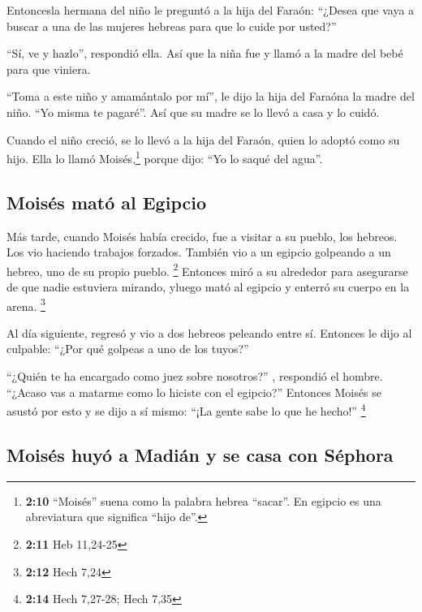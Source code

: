  Entoncesla hermana del niño le preguntó a la hija del
Faraón: ``¿Desea que vaya a buscar a una de las mujeres hebreas para que
lo cuide por usted?''

 ``Sí, ve y hazlo'', respondió ella. Así que la niña fue y
llamó a la madre del bebé para que viniera.

 ``Toma a este niño y amamántalo por mí'', le dijo la hija
del Faraóna la madre del niño. ``Yo misma te pagaré''. Así que su madre
se lo llevó a casa y lo cuidó.

 Cuando el niño creció, se lo llevó a la hija del Faraón,
quien lo adoptó como su hijo. Ella lo llamó Moisés,\footnote{\textbf{2:10}
  ``Moisés'' suena como la palabra hebrea ``sacar''. En egipcio es una
  abreviatura que significa ``hijo de''.} porque dijo: ``Yo lo saqué del
agua''.

\hypertarget{moisuxe9s-matuxf3-al-egipcio}{%
\subsection{Moisés mató al Egipcio}\label{moisuxe9s-matuxf3-al-egipcio}}

 Más tarde, cuando Moisés había crecido, fue a visitar a
su pueblo, los hebreos. Los vio haciendo trabajos forzados. También vio
a un egipcio golpeando a un hebreo, uno de su propio pueblo. \footnote{\textbf{2:11}
  Heb 11,24-25}  Entonces miró a su alrededor para
asegurarse de que nadie estuviera mirando, yluego mató al egipcio y
enterró su cuerpo en la arena. \footnote{\textbf{2:12} Hech 7,24}

 Al día siguiente, regresó y vio a dos hebreos peleando
entre sí. Entonces le dijo al culpable: ``¿Por qué golpeas a uno de los
tuyos?''

 ``¿Quién te ha encargado como juez sobre nosotros?'' ,
respondió el hombre. ``¿Acaso vas a matarme como lo hiciste con el
egipcio?'' Entonces Moisés se asustó por esto y se dijo a sí mismo:
``¡La gente sabe lo que he hecho!'' \footnote{\textbf{2:14} Hech
  7,27-28; Hech 7,35}

\hypertarget{moisuxe9s-huyuxf3-a-madiuxe1n-y-se-casa-con-suxe9phora}{%
\subsection{Moisés huyó a Madián y se casa con
Séphora}\label{moisuxe9s-huyuxf3-a-madiuxe1n-y-se-casa-con-suxe9phora}}

